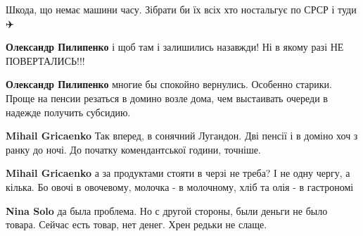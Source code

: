 \begin{itemize}
Шкода, що немає машини часу. Зібрати би їх всіх хто ностальгує по СРСР і туди✈️

\begin{itemize}
 
\textbf{Олександр Пилипенко} і щоб там і залишились назавжди! Ні в якому разі НЕ ПОВЕРТАЛИСЬ!!!

 
\textbf{Олександр Пилипенко} многие бы спокойно вернулись. Особенно старики. Проще на пенсии резаться в домино возле дома, чем выстаивать очереди в надежде получить субсидию.

 
\textbf{Mihail Gricaenko} Так вперед, в сонячний Лугандон. Дві пенсії і в доміно хоч з ранку до ночі. До початку комендантської години, точніше.

 
\textbf{Mihail Gricaenko} а за продуктами стояти в черзі не треба? І не одну чергу, а кілька. Бо овочі в овочевому, молочка - в молочному, хліб та олія - в гастрономі

 
\textbf{Nina Solo} да была проблема. Но с другой стороны, были деньги не было товара. Сейчас есть товар, нет денег.
Хрен редьки не слаще.


\end{itemize}
\end{itemize}
